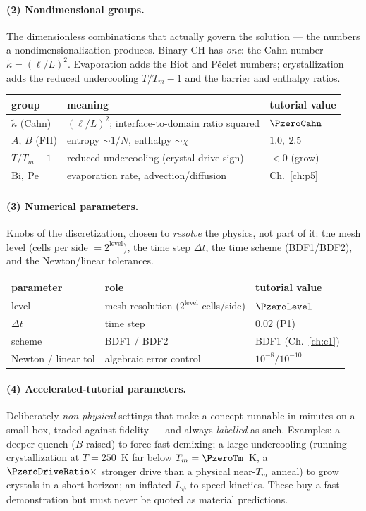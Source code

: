\paragraph{(2) Nondimensional groups.} The dimensionless combinations that
actually govern the solution --- the numbers a nondimensionalization
produces. Binary CH has \emph{one}: the Cahn number
$\tilde\kappa=(\ell/L)^2$. Evaporation adds the Biot and P\'eclet numbers;
crystallization adds the reduced undercooling $T/T_m-1$ and the barrier and
enthalpy ratios.
\begin{center}\small
\begin{tabular}{lll}
\toprule
group & meaning & tutorial value \\
\midrule
$\tilde\kappa$ (Cahn) & $(\ell/L)^2$; interface-to-domain ratio squared & $\PzeroCahn$ \\
$A,\,B$ (FH) & entropy $\sim1/N$, enthalpy $\sim\chi$ & $1.0,\ 2.5$ \\
$T/T_m-1$ & reduced undercooling (crystal drive sign) & $<0$ (grow) \\
$\mathrm{Bi},\ \mathrm{Pe}$ & evaporation rate, advection/diffusion & Ch.~\ref{ch:p5} \\
\bottomrule
\end{tabular}
\end{center}

\paragraph{(3) Numerical parameters.} Knobs of the discretization, chosen
to \emph{resolve} the physics, not part of it: the mesh level (cells per
side $=2^{\text{level}}$), the time step $\Delta t$, the time scheme
(BDF1/BDF2), and the Newton/linear tolerances.
\begin{center}\small
\begin{tabular}{lll}
\toprule
parameter & role & tutorial value \\
\midrule
level & mesh resolution ($2^{\text{level}}$ cells/side) & $\PzeroLevel$ \\
$\Delta t$ & time step & $0.02$ (P1) \\
scheme & BDF1 / BDF2 & BDF1 (Ch.~\ref{ch:c1}) \\
Newton / linear tol & algebraic error control & $10^{-8}/10^{-10}$ \\
\bottomrule
\end{tabular}
\end{center}

\paragraph{(4) Accelerated-tutorial parameters.} Deliberately
\emph{non-physical} settings that make a concept runnable in minutes on a
small box, traded against fidelity --- and always \emph{labelled} as such.
Examples: a deeper quench ($B$ raised) to force fast demixing; a large
undercooling (running crystallization at $T=250$~K far below
$T_m=\PzeroTm$~K, a $\PzeroDriveRatio\times$ stronger drive than a physical
near-$T_m$ anneal) to grow crystals in a short horizon; an inflated $L_\psi$
to speed kinetics. These buy a fast demonstration but must never be quoted
as material predictions.

